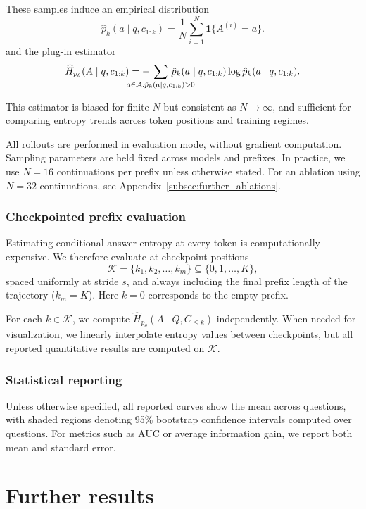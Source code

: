 \documentclass{article}
\begin{document}
These samples induce an empirical distribution
\[
\hat{p}_k(a \mid q, c_{1:k})
= \frac{1}{N} \sum_{i=1}^N \mathbf{1}\{A^{(i)} = a\}.
\]
and the plug-in estimator
\[
\widehat{H}_{p_\theta}(A \mid q, c_{1:k})
= -\mkern-46mu \sum_{a \in \mathcal{A} : \hat{p}_k(a \mid q, c_{1:k}) > 0}
\mkern-46mu 
\hat{p}_k(a \mid q, c_{1:k})
\log \hat{p}_k(a \mid q, c_{1:k}).
\]

This estimator is biased for finite \(N\) but consistent as \(N \to \infty\), and sufficient for comparing entropy trends across token positions and training regimes.

All rollouts are performed in evaluation mode, without gradient computation. Sampling parameters are held fixed across models and prefixes. In practice, we use $N=16$ continuations per prefix unless otherwise stated. For an ablation using $N=32$ continuations, see Appendix~\ref{subsec:further_ablations}.

\subsubsection{Checkpointed prefix evaluation}
\label{subsec:checkpointed_prefix_evaluation}

Estimating conditional answer entropy at every token is computationally expensive. We therefore evaluate at checkpoint positions
\[
\mathcal{K} = \{k_1, k_2, \dots, k_m\} \subseteq \{0,1,\dots,K\},
\]
spaced uniformly at stride $s$, and always including the final prefix length of the trajectory (\(k_m = K\)). Here \(k=0\) corresponds to the empty prefix.

For each \(k \in \mathcal{K}\), we compute \(\widehat{H}_{p_\theta}(A \mid Q, C_{\le k})\) independently. When needed for visualization, we linearly interpolate entropy values between checkpoints, but all reported quantitative results are computed on \(\mathcal{K}\).

\subsubsection{Statistical reporting}
\label{subsec:statistics}

Unless otherwise specified, all reported curves show the mean across questions, with shaded regions denoting 95\% bootstrap confidence intervals computed over questions. For metrics such as AUC or average information gain, we report both mean and standard error.
\onecolumn
\section{Further results}
\label{app:further_results}
\end{document}

